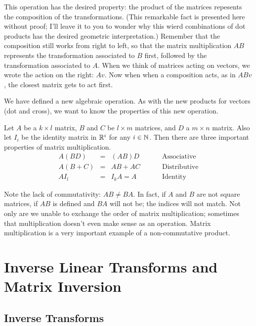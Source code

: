 \documentclass[fleqn]{report}
\begin{document}
This operation has the desired property: the product of the
matrices repesents the composition of the transformations.
(This remarkable fact is presented here without proof; I'll
leave it to you to wonder why this wierd combinations of dot
products has the desired geometric interpretation.)
Remember that the composition still works from right to
left, so that the matrix multiplication $AB$ represents the
transformation associated to $B$ first, followed by the
transformation associated to $A$. When we think of matrices
acting on vectors, we wrote the action on the right: $Av$. Now
when when a composition acts, as in $ABv$, the closest
matrix gets to act first.

We have defined a new algebraic operation. As with the new
products for vectors (dot and cross), we want to know the
properties of this new operation.

\begin{prop}
Let $A$ be a $k \times l$ matrix, $B$ and $C$ be $l \times m$
matrices, and $D$ a $m \times n$ matrix. Also let $I_i$ be
the identity matrix in $\mathbb{R}^i$ for any $i \in \mathbb{N}$. Then 
there are three important properties of matrix multiplication.
\begin{displaymath}
\begin{array}{rcll}
A(BD) & = & (AB) D \hspace{1cm} & \text{Associative} \\
A(B+C) & = & AB + AC \hspace{1cm} & \text{Distributive} \\
AI_l & = & I_kA = A \hspace{1cm} & \text{Identity}
\end{array}
\end{displaymath}
\end{prop}

Note the lack of commutativity: $AB \neq BA$. In fact, if $A$
and $B$ are not square matrices, if $AB$ is defined and $BA$
will not be; the indices will not match. Not only are we
unable to exchange the order of matrix multiplication;
sometimes that multiplication doesn't even make sense as an
operation. Matrix multiplication is a very important example
of a non-commutative product.

\chapter{Inverse Linear Transforms and Matrix Inversion}
\label{inversion}

\section{Inverse Transforms}
\end{document}
